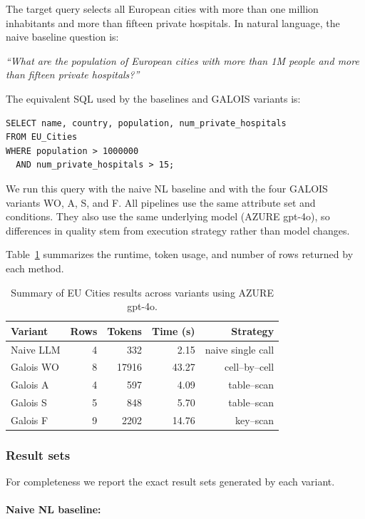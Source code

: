 \documentclass[11pt]{article}
\begin{document}
The target query selects all European cities with more than one million inhabitants and more than fifteen private hospitals. In natural language, the naive baseline question is:

\medskip
\emph{``What are the population of European cities with more than 1M people and more than fifteen private hospitals?''}
\medskip

The equivalent SQL used by the baselines and GALOIS variants is:
\begin{verbatim}
SELECT name, country, population, num_private_hospitals
FROM EU_Cities
WHERE population > 1000000
  AND num_private_hospitals > 15;
\end{verbatim}

We run this query with the naive NL baseline and with the four GALOIS variants WO, A, S, and F. All pipelines use the same attribute set and conditions. They also use the same underlying model (AZURE gpt-4o), so differences in quality stem from execution strategy rather than model changes.

Table~\ref{tab:summary_eu} summarizes the runtime, token usage, and number of rows returned by each method.

\begin{table}[h]
\centering
\label{tab:summary_eu}
\begin{tabular}{lrrrr}
\toprule
Variant    & Rows & Tokens & Time (s) & Strategy \\
\midrule
Naive LLM & 4 &   332 &  2.15 & naive single call \\
Galois WO & 8 & 17916 & 43.27 & cell–by–cell \\
Galois A  & 4 &   597 &  4.09 & table–scan \\
Galois S  & 5 &   848 &  5.70 & table–scan \\
Galois F  & 9 &  2202 & 14.76 & key–scan \\
\bottomrule
\end{tabular}
\caption{Summary of EU Cities results across variants using AZURE gpt-4o.}
\end{table}

\subsubsection{Result sets}

For completeness we report the exact result sets generated by each variant.

\paragraph{Naive NL baseline:}
\end{document}
